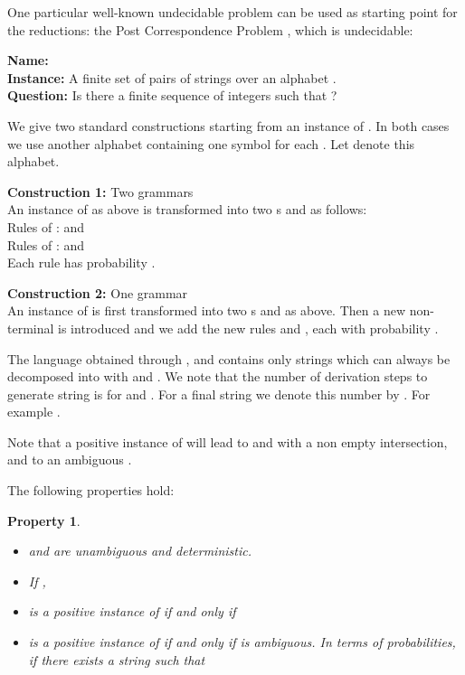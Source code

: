 \documentclass[submission]{eptcs} \usepackage{breakurl}             \usepackage[english]{babel}
\newtheorem{property}{Property}
\begin{document}
One particular well-known undecidable problem can be used as starting point for the reductions: the Post Correspondence Problem \cite{post46}, which is undecidable:


\noindent\textbf{Name:}   \\
\textbf{Instance:} A finite set  of pairs of strings  over an alphabet .\\
\textbf{Question:} Is there a finite sequence of integers  such that ?
\vspace{0.1in}

We give two standard constructions starting from an instance  of . In both cases we use another alphabet containing one symbol  for each . Let  denote this alphabet.

\vspace{0.1in}
\noindent\textbf{Construction 1:} Two grammars  \\
An instance of  as above is transformed into two s  and  as follows:\\
Rules of :  and  \\
Rules of :  and \\
Each rule has  probability .

\vspace{0.1in}
\noindent\textbf{Construction 2:} One grammar  \\
An instance of  is first transformed into two s  and  as above.
Then a new non-terminal  is introduced and we add the new rules  and , each with probability .

\vspace{0.1in}
The language obtained through ,  and  contains only strings  which can always be decomposed into  with  and . We note that the number of  derivation steps to generate string  is  for  and . For a final string  we denote this number by . For example .

Note that a positive instance of  will lead to  and  with a non empty intersection, and to an ambiguous .

The following properties hold:

\begin{property}~
\begin{itemize}
\item  and  are unambiguous and deterministic.
\item If , 
\item  is a positive instance of  if and only if 
\item  is a positive instance of  if and only if  is ambiguous. In terms of probabilities, if there exists a string  such that 
\end{itemize}
\end{property}
\end{document}
